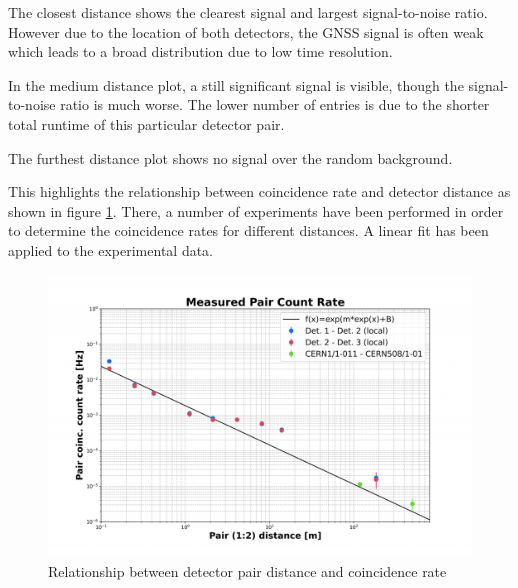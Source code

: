 \documentclass[abstract,toc,los,lof,english,10pt,glossary,acronyms]{jluthesis}
\begin{document}
The closest distance shows the clearest signal and largest signal-to-noise ratio. However due to the location of both detectors, the GNSS signal is often weak which leads to a broad distribution due to low time resolution.

In the medium distance plot, a still significant signal is visible, though the signal-to-noise ratio is much worse. The lower number of entries is due to the shorter total runtime of this particular detector pair.

The furthest distance plot shows no signal over the random background.

This highlights the relationship between coincidence rate and detector distance as shown in figure \ref{fig:pair-count-rate}. There, a number of experiments have been performed in order to determine the coincidence rates for different distances. A linear fit has been applied to the experimental data.
\begin{figure}[H]
	\centering
	\includegraphics[width=0.7\linewidth]{data/pair-count-rate}
	\caption{Relationship between detector pair distance and coincidence rate\cite{muonpi}}
	\label{fig:pair-count-rate}
\end{figure}
\end{document}
